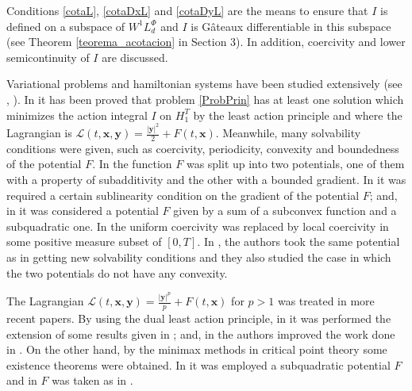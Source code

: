 \documentclass[twoside]{article}
\theoremstyle{remark}
\newcommand{\lphi}{L^{\Phi}}
\renewcommand{\b}[1]{\boldsymbol{#1}}
\begin{document}
Conditions \eqref{cotaL}, \eqref{cotaDxL} and \eqref{cotaDyL} are the means to ensure that $I$ is defined on 
a subspace of $W^{1}\lphi_d$ and $I$ is G\^ateaux differentiable in this subspace 
(see Theorem \ref{teorema_acotacion} in Section 3). 
In addition, coercivity and  lower semicontinuity  of $I$ are discussed. 


Variational problems and hamiltonian systems  have been studied extensively
(see \cite{mawhin2010critical}, {\color{red}\cite{struwe2008variational}}). 
In \cite{mawhin2010critical}  
it has been proved that problem \eqref{ProbPrin} has at least one solution which minimizes 
the action integral  $I$
on $H_1^T$ by the least action principle and where the Lagrangian is 
$\mathcal{L}(t,\b{x},\b{y})=\frac{|\b{y}|^2}{2}+F(t,\b{x}).$
Meanwhile, many solvability conditions were given, such as coercivity, periodicity, 
convexity and boundedness of the potential $F$. 
In  \cite{tang1995periodic} the function $F$
was split up into two potentials, one of them with a property of subadditivity and the other with a bounded
gradient.
In \cite{tang1998periodic} it was required a certain sublinearity condition on the gradient of the potential $F$; and, 
in \cite{wu1999periodic} it was considered a potential $F$ given by a sum of a subconvex function and a  subquadratic one. 
In  \cite{tang2001periodic} the uniform coercivity was replaced by local coercivity in some positive measure subset of $[0,T]$.
In \cite{zhao2004periodic}, the authors took the same potential as in \cite{wu1999periodic} getting new solvability conditions 
and they also studied the case in which the two potentials do not have any convexity.
%

The Lagrangian  $\mathcal{L}(t,\b{x},\b{y})=\frac{|\b{y}|^p}{p}+F(t,\b{x})$
for $p>1$ was treated in more recent papers.
By using the dual least action principle, in \cite{Tian2007192}
it was performed the extension of some results given in \cite{mawhin2010critical};
and, in \cite{tang2010periodic} the authors improved the work done in \cite{wu1999periodic}.
On the other hand, by the minimax methods in critical point theory 
some existence theorems were obtained.
In \cite{xu2007some} it was employed a subquadratic potential $F$ 
and in \cite{ye2008periodic} $F$ was taken as in \cite{tang1998periodic}.
\end{document}
